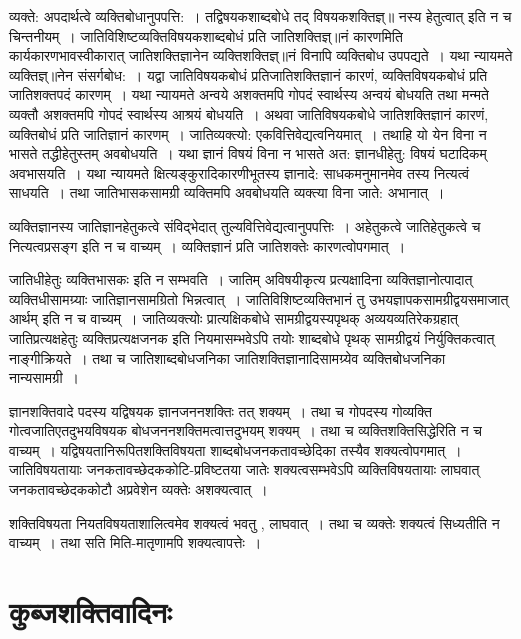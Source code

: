 {व्यक्ते: अपदार्थत्वे व्यक्तिबोधानुपपत्ति:~। तद्विषयकशाब्दबोधे तद् विषयकशक्तिज्ञ्॥ नस्य हेतुत्वात् इति न च चिन्तनीयम्~। जातिविशिष्टव्यक्तिविषयकशाब्दबोधं प्रति जातिशक्तिज्ञ्॥नं कारणमिति कार्यकारणभावस्वीकारात् जातिशक्तिज्ञानेन व्यक्तिशक्तिज्ञ्॥नं विनापि व्यक्तिबोध उपपद्यते~। यथा न्यायमते व्यक्तिज्ञ्॥नेन संसर्गबोध:~। यद्वा जातिविषयकबोधं प्रतिजातिशक्तिज्ञानं कारणं, व्यक्तिविषयकबोधं प्रति जातिशक्तपदं कारणम्~। यथा न्यायमते अन्वये अशक्तमपि गोपदं स्वार्थस्य अन्वयं बोधयति तथा मन्मते व्यक्तौ अशक्तमपि गोपदं स्वार्थस्य आश्रयं बोधयति~। अथवा जातिविषयकबोधे जातिशक्तिज्ञानं कारणं, व्यक्तिबोधं प्रति जातिज्ञानं कारणम्~। जातिव्यक्त्यो: एकवित्तिवेद्यत्वनियमात्~। तथाहि यो येन विना न भासते तद्धीहेतुस्तम् अवबोधयति~। यथा ज्ञानं विषयं विना न भासते अत: ज्ञानधीहेतु: विषयं घटादिकम् अवभासयति~। यथा न्यायमते क्षित्यङ्कुरादिकारणीभूतस्य ज्ञानादे: साधकमनुमानमेव तस्य नित्यत्वं साधयति~। तथा जातिभासकसामग्री व्यक्तिमपि अवबोधयति व्यक्त्या विना जाते: अभानात्~। 

व्यक्तिज्ञानस्य जातिज्ञानहेतुकत्वे संविद्भेदात् तुल्यवित्तिवेद्यत्वानुपपत्तिः~। अहेतुकत्वे जातिहेतुकत्वे च नित्यत्वप्रसङ्ग इति न च वाच्यम्~। व्यक्तिज्ञानं प्रति जातिशक्तेः कारणत्वोपगमात्~। 

जातिधीहेतुः व्यक्तिभासकः इति न सम्भवति~। जातिम् अविषयीकृत्य प्रत्यक्षादिना व्यक्तिज्ञानोत्पादात् व्यक्तिधीसामग्र्याः जातिज्ञानसामग्रितो भिन्नत्वात्~। जातिविशिष्टव्यक्तिभानं तु उभयज्ञापकसामग्रीद्वयसमाजात् आर्थम्  इति न च वाच्यम्~। जातिव्यक्त्योः  प्रात्यक्षिकबोधे सामग्रीद्वयस्यपृथक् अव्ययव्यतिरेकग्रहात् जातिप्रत्यक्षहेतुः व्यक्तिप्रत्यक्षजनक इति नियमासम्भवेऽपि तयोः शाब्दबोधे पृथक् सामग्रीद्वयं निर्युक्तिकत्वात् नाङ्गीक्रियते~। तथा च जातिशाब्दबोधजनिका जातिशक्तिज्ञानादिसामग्र्येव व्यक्तिबोधजनिका नान्यसामग्री~। 

ज्ञानशक्तिवादे पदस्य यद्विषयक ज्ञानजननशक्तिः तत् शक्यम्~। तथा च गोपदस्य गोव्यक्ति गोत्वजातिएतदुभयविषयक बोधजननशक्तिमत्वात्तदुभयम् शक्यम्~। तथा च व्यक्तिशक्तिसिद्धेरिति न च वाच्यम्~। यद्विषयतानिरूपितशक्तिविषयता शाब्दबोधजनकतावच्छेदिका तस्यैव शक्यत्वोपगमात्~। जातिविषयतायाः जनकतावच्छेदककोटि-प्रविष्टतया जातेः शक्यत्वसम्भवेऽपि व्यक्तिविषयतायाः लाघवात् जनकतावच्छेदककोटौ अप्रवेशेन व्यक्तेः अशक्यत्वात्~। 

शक्तिविषयता नियतविषयताशालित्वमेव शक्यत्वं भवतु , लाघवात्~। तथा च व्यक्तेः  शक्यत्वं सिध्यतीति न वाच्यम्~। तथा सति मिति-मातृणामपि शक्यत्वापत्तेः~। 

\section*{कुब्जशक्तिवादिनः}

}
